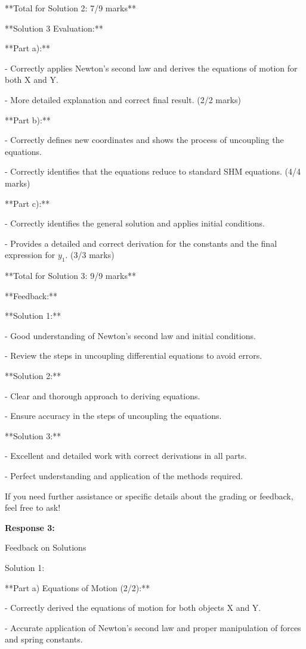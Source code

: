 \documentclass[a4paper,11pt]{article}
\begin{document}
**Total for Solution 2: 7/9 marks**

**Solution 3 Evaluation:**

**Part a):**

- Correctly applies Newton's second law and derives the equations of motion for both X and Y.

- More detailed explanation and correct final result. (2/2 marks)

**Part b):**

- Correctly defines new coordinates and shows the process of uncoupling the equations.

- Correctly identifies that the equations reduce to standard SHM equations. (4/4 marks)

**Part c):**

- Correctly identifies the general solution and applies initial conditions.

- Provides a detailed and correct derivation for the constants and the final expression for \( y_1 \). (3/3 marks)

**Total for Solution 3: 9/9 marks**

**Feedback:**

**Solution 1:**

- Good understanding of Newton's second law and initial conditions.

- Review the steps in uncoupling differential equations to avoid errors.

**Solution 2:**

- Clear and thorough approach to deriving equations.

- Ensure accuracy in the steps of uncoupling the equations.

**Solution 3:**

- Excellent and detailed work with correct derivations in all parts.

- Perfect understanding and application of the methods required.

If you need further assistance or specific details about the grading or feedback, feel free to ask!

\bigskip
\textbf{Response 3:}

Feedback on Solutions

Solution 1:

**Part a) Equations of Motion (2/2):**

- Correctly derived the equations of motion for both objects X and Y.

- Accurate application of Newton's second law and proper manipulation of forces and spring constants.
\end{document}
